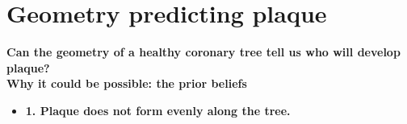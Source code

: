 \section{Geometry predicting plaque}

\textbf{Can the geometry of a healthy coronary tree tell us who will develop plaque?} \\



\noindent \textbf{Why it could be possible: the prior beliefs}

\begin{itemize}
    \item \textbf{1. Plaque does not form evenly along the tree.}
\end{itemize}